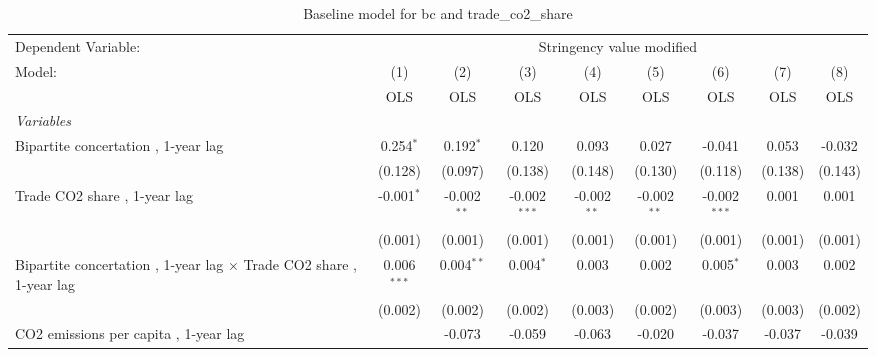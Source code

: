 
\begin{table}[htbp]
   \caption{Baseline model for bc and trade\_co2\_share}
   \centering
   \begin{tabular}{lcccccccc}
      \toprule
      Dependent Variable: & \multicolumn{8}{c}{Stringency value modified}\\
      Model:                                                                     & (1)           & (2)           & (3)            & (4)           & (5)           & (6)            & (7)           & (8)\\  
                                                                                 &  OLS          & OLS           & OLS            & OLS           & OLS           & OLS            & OLS           & OLS\\  
      \midrule
      \emph{Variables}\\
      Bipartite concertation , 1-year lag                                        & 0.254$^{*}$   & 0.192$^{*}$   & 0.120          & 0.093         & 0.027         & -0.041         & 0.053         & -0.032\\   
                                                                                 & (0.128)       & (0.097)       & (0.138)        & (0.148)       & (0.130)       & (0.118)        & (0.138)       & (0.143)\\   
      Trade CO2 share , 1-year lag                                               & -0.001$^{*}$  & -0.002$^{**}$ & -0.002$^{***}$ & -0.002$^{**}$ & -0.002$^{**}$ & -0.002$^{***}$ & 0.001         & 0.001\\   
                                                                                 & (0.001)       & (0.001)       & (0.001)        & (0.001)       & (0.001)       & (0.001)        & (0.001)       & (0.001)\\   
      Bipartite concertation , 1-year lag $\times$ Trade CO2 share , 1-year lag  & 0.006$^{***}$ & 0.004$^{**}$  & 0.004$^{*}$    & 0.003         & 0.002         & 0.005$^{*}$    & 0.003         & 0.002\\   
                                                                                 & (0.002)       & (0.002)       & (0.002)        & (0.003)       & (0.002)       & (0.003)        & (0.003)       & (0.002)\\   
      CO2 emissions per capita , 1-year lag                                      &               & -0.073        & -0.059         & -0.063        & -0.020        & -0.037         & -0.037        & -0.039\\   

\end{tabular}
\end{table}
